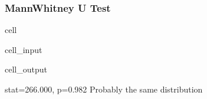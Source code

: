 \documentclass[letterpaper,10pt,english]{jupyterBook}
\begin{document}
\subsubsection{Mann\sphinxhyphen{}Whitney U Test}
\label{\detokenize{notebooks/testing_malaysian_paper:mann-whitney-u-test}}
\begin{sphinxuseclass}{cell}\begin{sphinxVerbatimInput}

\begin{sphinxuseclass}{cell_input}
\begin{sphinxVerbatim}[commandchars=\\\{\}]

    
   
   
\end{sphinxVerbatim}

\end{sphinxuseclass}\end{sphinxVerbatimInput}
\begin{sphinxVerbatimOutput}

\begin{sphinxuseclass}{cell_output}
\begin{sphinxVerbatim}[commandchars=\\\{\}]
stat=266.000, p=0.982
Probably the same distribution
\end{sphinxVerbatim}

\end{sphinxuseclass}\end{sphinxVerbatimOutput}

\end{sphinxuseclass}
\end{document}
